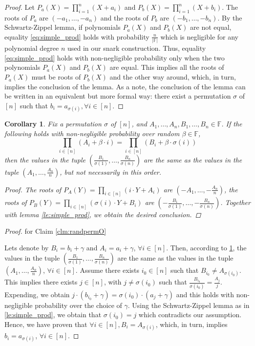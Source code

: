 \documentclass[11pt]{article} %
\newcommand{\F}{\ensuremath{\mathbb F}\xspace}
\newtheorem{corollary}[lemma]{Corollary}
\begin{document}
\begin{proof}
Let $P_a(X) =  \prod_{i=1}^{n}(X+ a_i)$ and $P_b(X) = \prod_{i=1}^{n}(X+b_i)$. The roots of $P_a$ are $(-a_1, \ldots, -a_n)$ and the roots of $P_b$ are $(-b_1, \ldots, -b_n)$.  
By the Schwartz-Zippel lemma, if polynomials $P_a(X)$ and $P_b(X)$ are not equal, equality \ref{eq:simple_prod} holds with probability $\frac{n}{|\mathbb{F}|}$ which is negligible for any polynomial degree $n$ used in our snark construction. 
Thus, equality \ref{eq:simple_prod} holds with non-negligible probability only when the two polynomials $P_a(X)$ and $P_b(X)$ are equal. This implies all the roots of $P_a(X)$ must be roots of $P_b(X)$ and the other way around, which, in turn, 
implies the conclusion of the lemma. As a note, the conclusion of the lemma can be written in an equivalent but more formal way: there exist a permutation $\sigma$ of $[n]$ such that $b_i = a_{\sigma(i)}, \forall i \in [n]$.
\end{proof}

\begin{corollary} \label{co:simple_prod}
Fix a permutation $\sigma$ of $[n]$, and $A_1,\ldots,A_n,B_1,\ldots,B_n \in \F$. If the following holds with non-negligible probability over random $\beta \in \F$, 
 \[\prod_{i\in [n]} (A_i + \beta \cdot i) = \prod_{i\in [n]} (B_i+ \beta \cdot \sigma(i))\] 
 then the values in the tuple $(\frac{B_1}{\sigma(1)}, \ldots, \frac{B_n}{\sigma(n)})$ are the same as the values in the tuple $(A_1, \ldots, \frac{A_n}{n})$, but not necessarily in this order. 
  
\begin{proof} The roots of $P_A(Y) = \prod_{i\in [n]} (i \cdot Y + A_i )$ are $(-A_1, \ldots, -\frac{A_n}{n})$, the roots of $P_B(Y) =  \prod_{i\in [n]} (\sigma (i) \cdot Y + B_i)$ are  $(-\frac{B_1}{\sigma(1)}, \ldots, -\frac{B_n}{\sigma(n)})$. Together with 
lemma \ref{le:simple_prod}, we obtain the desired conclusion.
\end{proof}

\end{corollary}

\begin{proof} for Claim \ref{clm:randpermO}

Lets denote by $B_i = b_i + \gamma$ and $A_i = a_i + \gamma$, $\forall i \in [n]$. Then, according to \ref{co:simple_prod}, the values in the tuple $(\frac{B_1}{\sigma(1)}, \ldots, \frac{B_n}{\sigma(n)})$ are the same as the values in 
the tuple $(A_1, \ldots, \frac{A_n}{n})$, $\forall i \in [n]$. Assume there exists $i_0 \in [n]$ such that $B_{i_0} \neq A_{\sigma(i_0)}$. This implies there exists $j \in [n]$, with $j \neq \sigma(i_0) $ such that $\frac{B_{i_0}}{\sigma(i_0)} = \frac{A_j}{j}$. 
Expending, we obtain $j \cdot (b_{i_0}+ \gamma) = \sigma(i_0) \cdot (a_j + \gamma)$ and this holds with non-negligible probability over the choice of $\gamma$. Using the Schwartz-Zippel lemma as in \ref{le:simple_prod}, 
we obtain that $\sigma(i_0) = j$ which contradicts our assumption. Hence, we have proven that $\forall  i \in [n], B_i = A_{\sigma(i)}$, which, in turn, implies $b_i = a_{\sigma(i)}$, $\forall  i \in [n]$. 
\end{proof}
\end{document}
